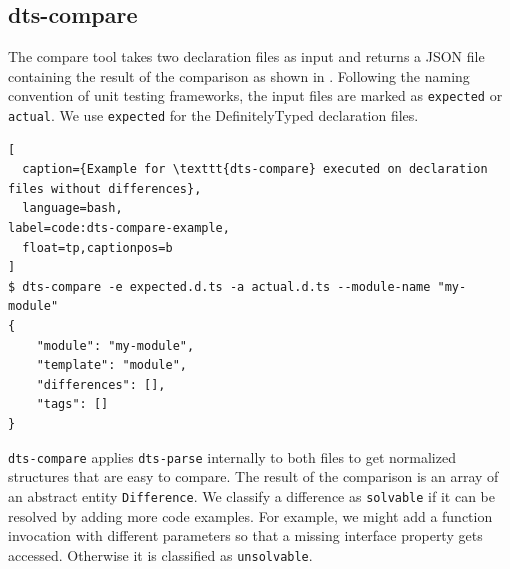 \documentclass[sigconf]{acmart}
\begin{document}
\subsection{dts-compare}
\label{sec:dts-compare}

The compare tool takes two declaration files as input and returns a
JSON file containing the result of the comparison as shown in
. Following the naming convention of unit
testing frameworks, the input files are marked as \lstinline{expected} or
\lstinline{actual}. We use \lstinline{expected} for the DefinitelyTyped
declaration files. 

\begin{lstlisting}[
  caption={Example for \texttt{dts-compare} executed on declaration files without differences},
  language=bash,
label=code:dts-compare-example,
  float=tp,captionpos=b
]
$ dts-compare -e expected.d.ts -a actual.d.ts --module-name "my-module"
{
    "module": "my-module",
    "template": "module",
    "differences": [],
    "tags": []
}
\end{lstlisting}

\texttt{dts-compare} applies \texttt{dts-parse} internally to both files to get 
normalized structures that are easy to compare. The result of the comparison is an array
of an abstract entity \texttt{Difference}. 
We classify a difference as \texttt{solvable} if it can be resolved by adding more code
examples. For example, we might add a function invocation with different parameters so that a missing
interface property gets accessed. Otherwise it is classified as  \texttt{unsolvable}. 
\end{document}
